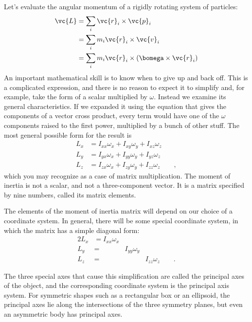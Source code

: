 Let's evaluate the angular momentum of a rigidly rotating
system of particles:
\begin{align*}
        \vc{L}        &= \sum_i \vc{r}_i \times \vc{p}_i \\
                        &= \sum_i m_i \vc{r}_i \times \vc{v}_i \\
                        &= \sum_i m_i \vc{r}_i \times (\bomega \times \vc{r}_i)
\end{align*}
An important mathematical skill is to know when to give up
and back off. This is a complicated expression, and there is
no reason to expect it to simplify and, for example, take
the form of a scalar multiplied by $\omega$. Instead we examine its
general characteristics. If we expanded it using the
equation that gives the components of a vector cross
product, every term would have one of the $\omega$ components
raised to the first power, multiplied by a bunch of other
stuff. The most general possible form for the result
is
\begin{align*}
                L_x        &=  I_{xx}\omega_x + I_{xy}\omega_y + I_{xz}\omega_z\\
                L_y        &=  I_{yx}\omega_x + I_{yy}\omega_y + I_{yz}\omega_z\\
                L_z        &=  I_{zx}\omega_x + I_{zy}\omega_y + I_{zz}\omega_z \qquad  ,
\end{align*}
which you may recognize as a case of matrix multiplication.
The moment of inertia is not a scalar, and not a
three-component vector. It is a matrix specified by nine
numbers, called its matrix elements.

The elements of the moment of inertia matrix will depend on
our choice of a coordinate system. In general, there will be
some special coordinate system, in which the matrix has a
simple diagonal form:
\begin{alignat*}{2}
        L_x        &=  I_{xx}\omega_x & & \\
        L_y        &=   & I_{yy}\omega_y & \\
        L_z        &=  & & I_{zz}\omega_z \qquad .
\end{alignat*}

The three special axes that cause this simplification are
called the principal axes of the object, and the
corresponding coordinate system is the principal axis
system. For symmetric shapes such as a rectangular box or an
ellipsoid, the principal axes lie along the intersections of
the three symmetry planes, but even an asymmetric body has
principal axes.

